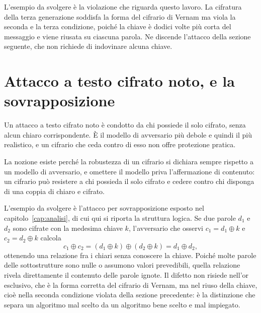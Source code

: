 L'esempio da svolgere è la violazione che riguarda questo lavoro. La cifratura della terza generazione soddisfa la forma del cifrario di Vernam ma viola la seconda e la terza condizione, poiché la chiave è dodici volte più corta del messaggio e viene riusata su ciascuna parola. Ne discende l'attacco della sezione seguente, che non richiede di indovinare alcuna chiave.

\section{Attacco a testo cifrato noto, e la sovrapposizione}

Un attacco a testo cifrato noto è condotto da chi possiede il solo cifrato, senza alcun chiaro corrispondente. È il modello di avversario più debole e quindi il più realistico, e un cifrario che ceda contro di esso non offre protezione pratica.

La nozione esiste perché la robustezza di un cifrario si dichiara sempre rispetto a un modello di avversario, e omettere il modello priva l'affermazione di contenuto: un cifrario può resistere a chi possieda il solo cifrato e cedere contro chi disponga di una coppia di chiaro e cifrato.

L'esempio da svolgere è l'attacco per sovrapposizione esposto nel capitolo~\ref{cap:analisi}, di cui qui si riporta la struttura logica. Se due parole $d_1$ e $d_2$ sono cifrate con la medesima chiave $k$, l'avversario che osservi $c_1 = d_1 \oplus k$ e $c_2 = d_2 \oplus k$ calcola
\begin{equation}
c_1 \oplus c_2 = (d_1 \oplus k) \oplus (d_2 \oplus k) = d_1 \oplus d_2,
\end{equation}
ottenendo una relazione fra i chiari senza conoscere la chiave. Poiché molte parole delle sottostrutture sono nulle o assumono valori prevedibili, quella relazione rivela direttamente il contenuto delle parole ignote. Il difetto non risiede nell'or esclusivo, che è la forma corretta del cifrario di Vernam, ma nel riuso della chiave, cioè nella seconda condizione violata della sezione precedente: è la distinzione che separa un algoritmo mal scelto da un algoritmo bene scelto e mal impiegato.
